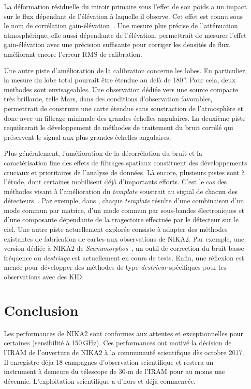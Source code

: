 La déformation résiduelle du miroir primaire sous l'effet de son poids
a un impact sur le flux dépendant de l'élévation à laquelle il
observe. Cet effet est connu sous le nom de corrélation
gain-élévation~\citep{Greve1998b}. Une mesure plus précise de
l'atténuation atmosphérique, elle aussi dépendante de l'élévation, 
permettrait de mesurer l'effet gain-élévation avec une précision
suffisante pour corriger les densités de flux, améliorant encore
l'erreur RMS de calibration.

Une autre piste d'amélioration de la calibration concerne les
lobes. En particulier, la mesure du lobe total pourrait être étendue
au delà de 180''. Pour cela, deux methodes sont
envisageables. Une observation dédiée vers une source compacte très
brillante, telle Mars, dans des conditions d'observation favorables,
permettrait de construire une carte étendue sans soustraction de
l'atmosphère et donc avec un filtrage minimale des grandes échelles
angulaires. La deuxième piste requièrerait le développement de
méthodes de traitement du bruit corrélé qui préservent le signal aux
plus grandes échelles angulaires.


Plus généralement, l'amélioration de la décorrélation du bruit et la
caractérisation fine des effets de filtrages spatiaux constituent des
développements cruciaux et prioritaires de l'analyse de données. Là
encore, plusieurs pistes sont à l'étude, dont certaines mobilisent
déjà d'importants efforts. C'est le cas des méthodes visant à
l'amélioration du \emph{template} soustrait au signal de chacun des
détecteurs~\citep{Ponthieu2020}. Par exemple, dans \citet{Ruppin2019},
chaque \emph{template} résulte d'une combinaison d'un mode commun par
matrice, d'un mode commun par sous-bandes électroniques et d'une
composante dépendante de la tragectoire effectuée par le détecteur sur
le ciel. Une autre piste actuellement explorée consiste à adapter des
méthodes existantes de fabrication de cartes aux observations de
NIKA2. Par exemple, une version dédiée à NIKA2 de
\emph{Scanamorphos}~\citep{Roussel2013, Roussel2018}, un outil de
correction du bruit basse-fréquence ou \emph{destriage} est
actuellement en cours de tests. Enfin, une réflexion est menée pour
développer des méthodes de type \emph{destrieur} spécifiques pour les
observations avec des KID.

\section{Conclusion}
Les performances de NIKA2 sont conformes aux attentes
et exceptionnelles pour certaines (sensibilité à 150\,GHz). Ces
performances ont motivé la décision de l'IRAM de
l'ouverture de NIKA2 à la communauté scientifique dès octobre 2017.
Il enregistre déja 18 campagnes d'observation scientifique et restera
un instrument à demeure du télescope de 30-m de l'IRAM pour
au moins une décennie. L'exploitation scientifique a d'hors et déjà
commencée.

